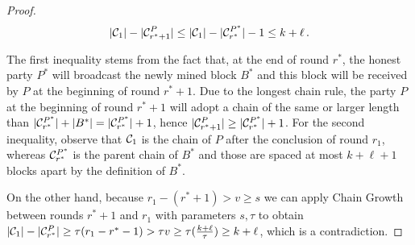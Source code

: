 \begin{proof}
  \[
     |\mathcal{C}_1| - |\mathcal{C}^P_{r^* + 1}| \leq
     |\mathcal{C}_1| - |\mathcal{C}^{P^*}_{r^*}| - 1 \leq
     k + \ell\,.
  \]

  The first inequality stems from the fact that, at the end of round
  $r^*$, the honest party $P^*$ will broadcast the newly mined block $B^*$
  and this block will be received by $P$ at the beginning of round $r^* + 1$.
  Due to the longest chain rule, the party $P$ at the beginning of round $r^* + 1$ will
  adopt a chain of the same or larger length than
  $|\mathcal{C}^{P^*}_{r^*}| + |B^*| = |\mathcal{C}^{P^*}_{r^*}| + 1$,
  hence
  $|\mathcal{C}^P_{r^* + 1}| \geq |\mathcal{C}^{P^*}_{r^*}| + 1$.
  For the second inequality, observe that
  $\mathcal{C}_1$ is the chain of $P$ after the conclusion
  of round $r_1$, whereas $\mathcal{C}^{P^*}_{r^*}$ is
  the parent chain of $B^*$ and those are spaced at most $k + \ell + 1$ blocks apart by the definition
  of $B^*$.

  On the other hand, because $r_1 - (r^* + 1) > v \geq s$ we can apply Chain Growth
  between rounds $r^* + 1$ and $r_1$
  with parameters
  $s, \tau$ to obtain
  $|\mathcal{C}_1| - |\mathcal{C}^P_{r^*}| \geq \tau(r_1 - r^* - 1) > \tau v \geq
  \tau (\frac{k + \ell}{\tau}) \geq k + \ell$,
  which is a contradiction.

  \Qed
\end{proof}